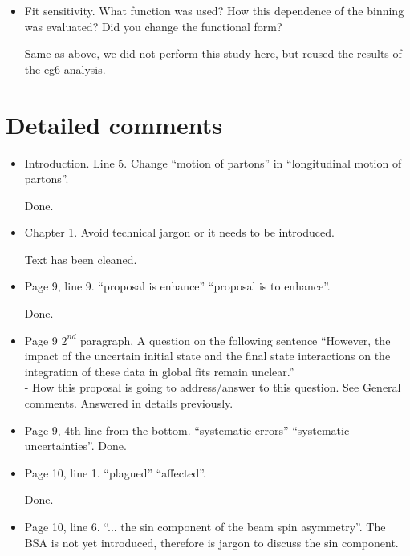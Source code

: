 \begin{itemize}
\begin{itemize}
   \item Fit sensitivity. What function was used? How this dependence of the binning was evaluated? Did you change the functional form?

{\color{red} Same as above, we did not perform this study here, but reused the results of the eg6 analysis.}

  \end{itemize}
  
  \end{itemize}
 

\section*{Detailed comments} 


 \begin{itemize}
 
  \item Introduction. Line 5. Change ``motion of partons'' in ``longitudinal motion of partons''.

     {\color{red} Done.}
  
  \item Chapter 1. Avoid technical jargon or it needs to be introduced.
       
     {\color{red} Text has been cleaned.}
  
  \item Page 9, line 9. ``proposal is enhance'' \rarr ``proposal is to enhance''.
     
     {\color{red} Done.}
    
  \item  Page 9 $2^{nd}$ paragraph, A question on the following sentence  
     ``However, the impact of the uncertain initial state and the final state 
       interactions on the integration of these data in global fits remain 
       unclear.'' \\
  - How this proposal is going to address/answer to this question. See General comments.
     {\color{red} Answered in details previously.}

  \item Page 9,  4th line from the bottom. ``systematic errors'' \rarr ``systematic uncertainties''.
     {\color{red} Done.}
  
  \item Page 10, line 1. ``plagued'' \rarr ``affected''.
     
     {\color{red} Done.}
  
  \item Page 10, line 6. ``... the sin component of the beam spin asymmetry''.  
     The BSA is not yet introduced, therefore is jargon to discuss the sin 
       component.
     

\end{itemize}
